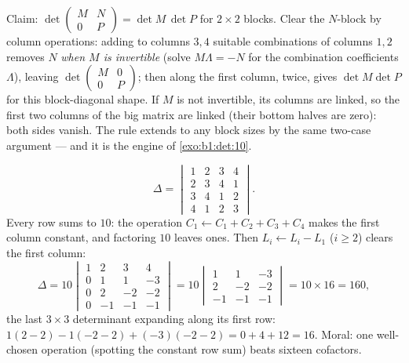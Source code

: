 \begin{example}
\label{ex:b1:det:blocktriangular}
Claim: $\det\begin{pmatrix} M & N\\ 0 & P\end{pmatrix} = \det
M\,\det P$ for $2\times2$ blocks. Clear the $N$-block by column
operations: adding to columns $3, 4$ suitable combinations of
columns $1, 2$ removes $N$ \emph{when $M$ is invertible} (solve
$M\Lambda = -N$ for the combination coefficients $\Lambda$),
leaving $\det\begin{pmatrix} M & 0\\ 0 & P\end{pmatrix}$; then
 along the first column, twice, gives $\det
M\det P$ for this block-diagonal shape. If $M$ is not
invertible, its columns are linked, so the first two columns of
the big matrix are linked (their bottom halves are zero): both
sides vanish. The rule extends to any block sizes by the same
two-case argument --- and it is the engine of
\cref{exo:b1:det:10}.
\end{example}

\begin{example}
\label{ex:b1:det:fourbyfour}
\[
\Delta = \begin{vmatrix}
1 & 2 & 3 & 4\\
2 & 3 & 4 & 1\\
3 & 4 & 1 & 2\\
4 & 1 & 2 & 3
\end{vmatrix}.
\]
Every row sums to $10$: the operation $C_1 \leftarrow C_1 + C_2 +
C_3 + C_4$ makes the first column constant, and factoring $10$
leaves ones. Then $L_i \leftarrow L_i - L_1$ ($i \geq 2$) clears
the first column:
\[
\Delta = 10\begin{vmatrix}
1 & 2 & 3 & 4\\
0 & 1 & 1 & -3\\
0 & 2 & -2 & -2\\
0 & -1 & -1 & -1
\end{vmatrix}
= 10\begin{vmatrix}
1 & 1 & -3\\
2 & -2 & -2\\
-1 & -1 & -1
\end{vmatrix}
= 10 \times 16 = 160,
\]
the last $3\times3$ determinant expanding along its first row:
$1(2 - 2) - 1(-2 - 2) + (-3)(-2 - 2) = 0 + 4 + 12 = 16$. Moral:
one well-chosen operation (spotting the constant row sum) beats
sixteen cofactors.
\end{example}

